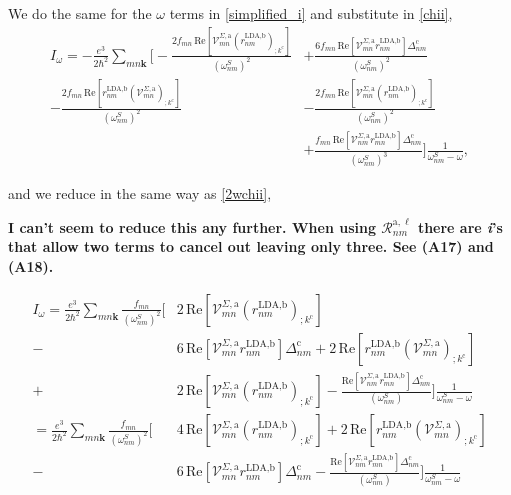 \documentclass[10pt]{article}
\begin{document}
We do the same for the $\omega$ terms in \eqref{simplified_i} and substitute in \eqref{chii},
\begin{align}\label{wchii}
I_{\omega}
= -\frac{e^3}{2\hbar^2}\sum_{mn\mathbf{k}}
\Biggl[
-\frac{2f_{mn}\,\mathrm{Re}\left[\mathcal{V}^{\Sigma,\text{a}}_{mn}\left(r^{\text{LDA,b}}_{nm}\right)_{;k^{\text{c}}}\right]}{(\omega^{S}_{nm})^{2}}
&+ \frac{6f_{mn}\,\mathrm{Re}\left[\mathcal{V}^{\Sigma,\text{a}}_{mn}r^{\text{LDA,b}}_{nm}\right]\Delta^{\text{c}}_{nm}}{(\omega^{S}_{nm})^{2}}\nonumber\\
- \frac{2f_{mn}\,\mathrm{Re}\left[r^{\text{LDA,b}}_{nm}\left(\mathcal{V}^{\Sigma,\text{a}}_{mn}\right)_{;k^{\text{c}}}\right]}{(\omega^{S}_{nm})^{2}}
&- \frac{2f_{mn}\,\mathrm{Re}\left[\mathcal{V}^{\Sigma,\text{a}}_{mn}\left(r^{\text{LDA,b}}_{nm}\right)_{;k^{\text{c}}}\right]}{(\omega^{S}_{nm})^{2}}\nonumber\\
&+ \frac{f_{mn}\,\mathrm{Re}\left[\mathcal{V}^{\Sigma,\text{a}}_{nm}r^{\text{LDA,b}}_{mn}\right]\Delta_{nm}^{\text{c}}}{(\omega^{S}_{nm})^{3}}
\Biggr]\frac{1}{\omega^{S}_{nm}-\omega},
\end{align}

and we reduce in the same way as \eqref{2wchii},

\textbf{I can't seem to reduce this any further. When using $\mathcal{R}^{\text{a},\ell}_{nm}$ there are \emph{i}'s that allow two terms to cancel out leaving only three. See (A17) and (A18).}

\begin{align}\label{wchii_simplified}
I_{\omega}
= \frac{e^3}{2\hbar^2}\sum_{mn\mathbf{k}}\frac{f_{mn}}{(\omega^{S}_{nm})^{2}}
\Biggl[
  &2\,\mathrm{Re}\left[\mathcal{V}^{\Sigma,\text{a}}_{mn}\left(r^{\text{LDA,b}}_{nm}\right)_{;k^{\text{c}}}\right]\nonumber\\
- &6\,\mathrm{Re}\left[\mathcal{V}^{\Sigma,\text{a}}_{mn}r^{\text{LDA,b}}_{nm}\right]\Delta^{\text{c}}_{nm} 
+  2\,\mathrm{Re}\left[r^{\text{LDA,b}}_{nm}\left(\mathcal{V}^{\Sigma,\text{a}}_{mn}\right)_{;k^{\text{c}}}\right]\nonumber\\
+ &2\,\mathrm{Re}\left[\mathcal{V}^{\Sigma,\text{a}}_{mn}\left(r^{\text{LDA,b}}_{nm}\right)_{;k^{\text{c}}}\right]
- \frac{\mathrm{Re}\left[\mathcal{V}^{\Sigma,\text{a}}_{nm}r^{\text{LDA,b}}_{mn}\right]\Delta_{nm}^{\text{c}}}{(\omega^{S}_{nm})}
\Biggr]\frac{1}{\omega^{S}_{nm}-\omega}\nonumber\\
= \frac{e^3}{2\hbar^2}\sum_{mn\mathbf{k}}\frac{f_{mn}}{(\omega^{S}_{nm})^{2}}
\Biggl[
  &4\,\mathrm{Re}\left[\mathcal{V}^{\Sigma,\text{a}}_{mn}\left(r^{\text{LDA,b}}_{nm}\right)_{;k^{\text{c}}}\right]
+  2\,\mathrm{Re}\left[r^{\text{LDA,b}}_{nm}\left(\mathcal{V}^{\Sigma,\text{a}}_{mn}\right)_{;k^{\text{c}}}\right]\nonumber\\
- &6\,\mathrm{Re}\left[\mathcal{V}^{\Sigma,\text{a}}_{mn}r^{\text{LDA,b}}_{nm}\right]\Delta^{\text{c}}_{nm}
- \frac{\mathrm{Re}\left[\mathcal{V}^{\Sigma,\text{a}}_{nm}r^{\text{LDA,b}}_{mn}\right]\Delta_{nm}^{\text{c}}}{(\omega^{S}_{nm})}
\Biggr]\frac{1}{\omega^{S}_{nm}-\omega}
\end{align}
\end{document}
